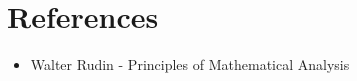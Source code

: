 \newpage
\section*{References}
\begin{itemize}
    \item Walter Rudin - Principles of Mathematical Analysis
\end{itemize}